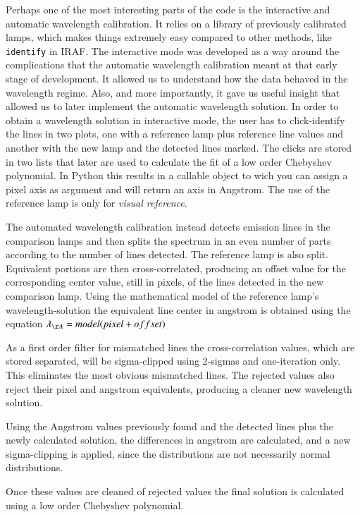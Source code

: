 \documentclass[11pt,twoside]{article}
\begin{document}
Perhaps one of the most interesting parts of the code is the interactive and
automatic wavelength calibration. It relies on a library of previously calibrated
lamps, which makes things extremely easy compared to other methods, like
\verb=identify= in IRAF.
The interactive mode was developed as a way around the complications that the automatic
wavelength calibration meant at that early stage of development. It allowed us to 
understand how the data behaved in the wavelength regime. Also, and more importantly,
it gave us useful insight that allowed us to later implement the automatic wavelength solution.
In order to obtain a wavelength solution in interactive mode, the user has to click-identify 
the lines in two plots, one with a reference lamp plus reference line values and
another with the new lamp and the detected lines marked. The clicks are stored in
two lists that later are used to calculate the fit of a low order Chebyshev polynomial.
In Python this results in a callable object to wich you can assign a pixel axis as argument
and will return an axis in Angstrom. The use of the reference lamp is only for
\emph{visual reference}.

The automated wavelength calibration instead detects emission lines in the comparison lamps
and then splits the spectrum in an even number of parts according to the number of lines detected.
The reference lamp is also split. Equivalent portions are then cross-correlated,
producing an offset value for the corresponding center value, still in pixels,
of the lines detected in the new comparison lamp. Using the mathematical model of the reference
lamp's wavelength-solution  the equivalent line center in angstrom is obtained 
using the equation $ \lambda_{\AA} = model(pixel + offset)$


As a first order filter for mismatched lines the cross-correlation values, which
are stored separated, will be sigma-clipped using 2-sigmas and one-iteration only.
This eliminates the most obvious mismatched lines. The rejected values also reject
their pixel and angstrom equivalents, producing a cleaner new wavelength solution.


Using the Angstrom values previously found and the detected lines
plus the newly calculated solution, the differences in angstrom are
calculated, and a new sigma-clipping is applied, since the distributions are not
necessarily normal distributions.

Once these values are cleaned of rejected values the final solution
is calculated using a low order Chebyshev polynomial.
\end{document}
